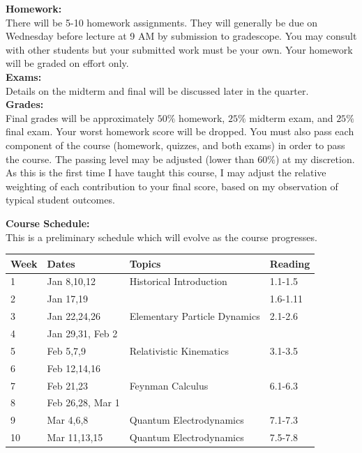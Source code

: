 \documentclass[12pt]{article}
\begin{document}
\noindent
\textbf{Homework:}\\ There will be 5-10 homework assignments.  They
will generally be due on Wednesday before lecture at 9 AM by
submission to gradescope.  You may consult with other students but
your submitted work must be your own.  Your homework will be graded on
effort only.\\[3pt]

\noindent
\noindent
\textbf{Exams:}\\
Details on the midterm and final will be discussed later in the quarter.\\[3pt]

\noindent
\textbf {Grades:}\\
Final grades will be approximately $50\%$ homework, $25\%$ midterm exam, 
and $25\%$ final exam. Your worst homework score will be dropped.  
You must also pass each component of the course (homework, quizzes, and both exams) in order to pass the course.  The passing level may be adjusted (lower than $60\%$) at my discretion. As this is the first time I have taught this course, I may adjust the relative weighting of each contribution to your final score, based on my observation of typical student outcomes.\\
\noindent

\noindent
\textbf {Course Schedule:}\\
This is a preliminary schedule which will evolve as the course progresses.\\

\noindent
\begin{tabular}{llll}
\textbf{Week} & \textbf{Dates} & \textbf{Topics} & \textbf{Reading} \\
\hline
1  & Jan 8,10,12      & Historical Introduction & 1.1-1.5    \\
\hline
2  & Jan 17,19        &                         &  1.6-1.11 \\
\hline
3  & Jan 22,24,26     & Elementary Particle Dynamics & 2.1-2.6 \\  
\hline
4  & Jan 29,31, Feb 2 & & \\
\hline
5  & Feb 5,7,9        & Relativistic Kinematics     & 3.1-3.5    \\
\hline
6  & Feb 12,14,16     & & \\
\hline
7  & Feb 21,23        & Feynman Calculus  & 6.1-6.3    \\
\hline
8  & Feb 26,28, Mar 1 & & \\
\hline
9  & Mar 4,6,8        & Quantum Electrodynamics & 7.1-7.3     \\
\hline
10 & Mar 11,13,15     & Quantum Electrodynamics & 7.5-7.8     \\
\hline
\end{tabular}\\ \vskip 1cm
\end{document}
